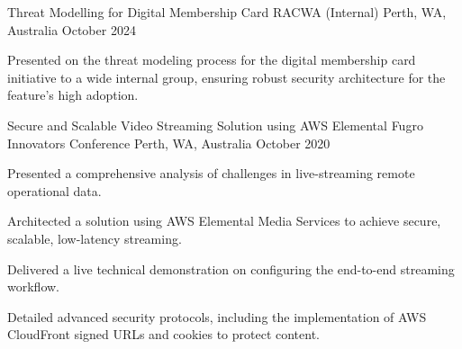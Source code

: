 

\begin{cventries}
  \cventry
    {Threat Modelling for Digital Membership Card} %
    {RACWA (Internal)} %
    {Perth, WA, Australia} %
    {October 2024} %
    {
      \begin{cvitems} %
        \item {Presented on the threat modeling process for the digital membership card initiative to a wide internal group, ensuring robust security architecture for the feature's high adoption.}
      \end{cvitems}
    }
  \cventry
    {Secure and Scalable Video Streaming Solution using AWS Elemental} %
    {Fugro Innovators Conference} %
    {Perth, WA, Australia} %
    {October 2020} %
    {
      \begin{cvitems} %
        \item {Presented a comprehensive analysis of challenges in live-streaming remote operational data.}
        \item {Architected a solution using AWS Elemental Media Services to achieve secure, scalable, low-latency streaming.}
        \item {Delivered a live technical demonstration on configuring the end-to-end streaming workflow.}
        \item {Detailed advanced security protocols, including the implementation of AWS CloudFront signed URLs and cookies to protect content.}
      \end{cvitems}
    }
\end{cventries}
